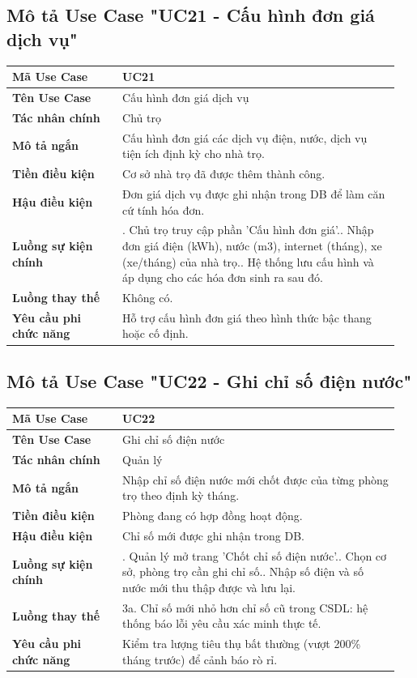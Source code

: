 \documentclass[a4paper,oneside]{report}
\begin{document}
\subsection{Mô tả Use Case "UC21 - Cấu hình đơn giá dịch vụ"}

\begin{longtable}[]{@{}>{\RaggedRight\arraybackslash}p{0.27\linewidth}>{\RaggedRight\arraybackslash}p{0.68\linewidth}@{}}
\toprule
\textbf{Mã Use Case} & UC21\tabularnewline
\midrule
\endhead
\textbf{Tên Use Case} & Cấu hình đơn giá dịch vụ\tabularnewline
\textbf{Tác nhân chính} & Chủ trọ\tabularnewline
\textbf{Mô tả ngắn} & Cấu hình đơn giá các dịch vụ điện, nước, dịch vụ
tiện ích định kỳ cho nhà trọ.\tabularnewline
\textbf{Tiền điều kiện} & Cơ sở nhà trọ đã được thêm thành
công.\tabularnewline
\textbf{Hậu điều kiện} & Đơn giá dịch vụ được ghi nhận trong DB để làm
căn cứ tính hóa đơn.\tabularnewline
\textbf{Luồng sự kiện chính} & 1. Chủ trọ truy cập
phần 'Cấu hình đơn giá'.\newline 2. Nhập đơn giá điện (kWh), nước
(m3), internet (tháng), xe (xe/tháng) của nhà trọ.\newline 3. Hệ
thống lưu cấu hình và áp dụng cho các hóa đơn sinh ra sau
đó.\tabularnewline
\textbf{Luồng thay thế} & Không có.\tabularnewline
\textbf{Yêu cầu phi chức năng} & Hỗ trợ cấu hình đơn giá theo hình thức
bậc thang hoặc cố định.\tabularnewline
\bottomrule
\end{longtable}

\subsection{Mô tả Use Case "UC22 - Ghi chỉ số điện nước"}

\begin{longtable}[]{@{}>{\RaggedRight\arraybackslash}p{0.27\linewidth}>{\RaggedRight\arraybackslash}p{0.68\linewidth}@{}}
\toprule
\textbf{Mã Use Case} & UC22\tabularnewline
\midrule
\endhead
\textbf{Tên Use Case} & Ghi chỉ số điện nước\tabularnewline
\textbf{Tác nhân chính} & Quản lý\tabularnewline
\textbf{Mô tả ngắn} & Nhập chỉ số điện nước mới chốt được của từng phòng
trọ theo định kỳ tháng.\tabularnewline
\textbf{Tiền điều kiện} & Phòng đang có hợp đồng hoạt
động.\tabularnewline
\textbf{Hậu điều kiện} & Chỉ số mới được ghi nhận trong
DB.\tabularnewline
\textbf{Luồng sự kiện chính} & 1. Quản lý mở trang
'Chốt chỉ số điện nước'.\newline 2. Chọn cơ sở, phòng trọ cần ghi
chỉ số.\newline 3. Nhập số điện và số nước mới thu thập được và lưu
lại.\tabularnewline
\textbf{Luồng thay thế} & 3a. Chỉ số mới nhỏ hơn chỉ số cũ trong CSDL:
hệ thống báo lỗi yêu cầu xác minh thực tế.\tabularnewline
\textbf{Yêu cầu phi chức năng} & Kiểm tra lượng tiêu thụ bất thường
(vượt 200\% tháng trước) để cảnh báo rò rỉ.\tabularnewline
\bottomrule
\end{longtable}
\end{document}
